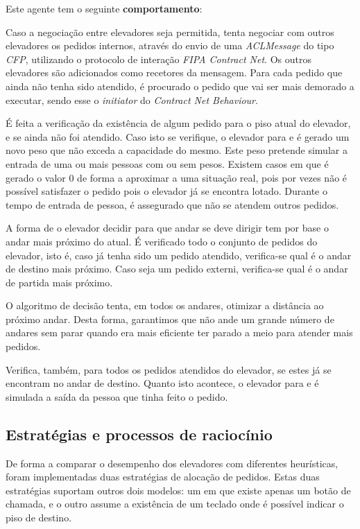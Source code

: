 \documentclass[a4paper]{article}
\begin{document}
Este agente tem o seguinte \textbf{comportamento}:

Caso a negociação entre elevadores seja permitida, tenta negociar com outros elevadores os pedidos internos, através do envio de uma \textit{ACLMessage} do tipo \textit{CFP}, utilizando o protocolo de interação \textit{FIPA Contract Net}. Os outros elevadores são adicionados como recetores da mensagem. Para cada pedido que ainda não tenha sido atendido, é procurado o pedido que vai ser mais demorado a executar, sendo esse o \textit{initiator} do \textit{Contract Net Behaviour}.

É feita a verificação da existência de algum pedido para o piso atual do elevador, e se ainda não foi atendido. Caso isto se verifique, o elevador para e é gerado um novo peso que não exceda a capacidade do mesmo. Este peso pretende simular a entrada de uma ou mais pessoas com ou sem pesos. Existem casos em que é gerado o valor 0 de forma a aproximar a uma situação real, pois por vezes não é possível satisfazer o pedido pois o elevador já se encontra lotado. Durante o tempo de entrada de pessoa, é assegurado que não se atendem outros pedidos.

A forma de o elevador decidir para que andar se deve dirigir tem por base o andar mais próximo do atual. É verificado todo o conjunto de pedidos do elevador, isto é, caso já tenha sido um pedido atendido, verifica-se qual é o andar de destino mais próximo. Caso seja um pedido externi, verifica-se qual é o andar de partida mais próximo.

O algoritmo de decisão tenta, em todos os andares, otimizar a distância ao próximo andar. Desta forma, garantimos que não ande um grande número de andares sem parar quando era mais eficiente ter parado a meio para atender mais pedidos.

Verifica, também, para todos os pedidos atendidos do elevador, se estes já se encontram no andar de destino. Quanto isto acontece, o elevador para e é simulada a saída da pessoa que tinha feito o pedido.

\subsection{Estratégias e processos de raciocínio} 

De forma a comparar o desempenho dos elevadores com diferentes heurísticas, foram implementadas duas estratégias de alocação de pedidos. Estas duas estratégias suportam outros dois modelos: um em que existe apenas um botão de chamada, e o outro assume a existência de um teclado onde é possível indicar o piso de destino.
\end{document}
